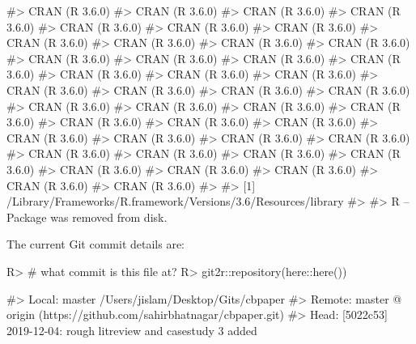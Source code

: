 \documentclass[
]{jss}
\begin{document}
\begin{CodeChunk}
\begin{CodeOutput}
#>  CRAN (R 3.6.0)                          
#>  CRAN (R 3.6.0)                          
#>  CRAN (R 3.6.0)                          
#>  CRAN (R 3.6.0)                          
#>  CRAN (R 3.6.0)                          
#>  CRAN (R 3.6.0)                          
#>  CRAN (R 3.6.0)                          
#>  CRAN (R 3.6.0)                          
#>  CRAN (R 3.6.0)                          
#>  CRAN (R 3.6.0)                          
#>  CRAN (R 3.6.0)                          
#>  CRAN (R 3.6.0)                          
#>  CRAN (R 3.6.0)                          
#>  CRAN (R 3.6.0)                          
#>  CRAN (R 3.6.0)                          
#>  CRAN (R 3.6.0)                          
#>  CRAN (R 3.6.0)                          
#>  CRAN (R 3.6.0)                          
#>  CRAN (R 3.6.0)                          
#>  CRAN (R 3.6.0)                          
#>  CRAN (R 3.6.0)                          
#>  CRAN (R 3.6.0)                          
#>  CRAN (R 3.6.0)                          
#>  CRAN (R 3.6.0)                          
#>  CRAN (R 3.6.0)                          
#>  CRAN (R 3.6.0)                          
#>  CRAN (R 3.6.0)                          
#>  CRAN (R 3.6.0)                          
#>  CRAN (R 3.6.0)                          
#>  CRAN (R 3.6.0)                          
#>  CRAN (R 3.6.0)                          
#>  CRAN (R 3.6.0)                          
#>  CRAN (R 3.6.0)                          
#>  CRAN (R 3.6.0)                          
#>  CRAN (R 3.6.0)                          
#>  CRAN (R 3.6.0)                          
#>  CRAN (R 3.6.0)                          
#>  CRAN (R 3.6.0)                          
#>  CRAN (R 3.6.0)                          
#>  CRAN (R 3.6.0)                          
#>  CRAN (R 3.6.0)                          
#>  CRAN (R 3.6.0)                          
#> 
#> [1] /Library/Frameworks/R.framework/Versions/3.6/Resources/library
#> 
#>  R -- Package was removed from disk.
\end{CodeOutput}
\end{CodeChunk}

The current Git commit details are:

\begin{CodeChunk}

\begin{CodeInput}
R> # what commit is this file at? 
R> git2r::repository(here::here())
\end{CodeInput}

\begin{CodeOutput}
#> Local:    master /Users/jislam/Desktop/Gits/cbpaper
#> Remote:   master @ origin (https://github.com/sahirbhatnagar/cbpaper.git)
#> Head:     [5022c53] 2019-12-04: rough litreview and casestudy 3 added
\end{CodeOutput}
\end{CodeChunk}


\end{document}
